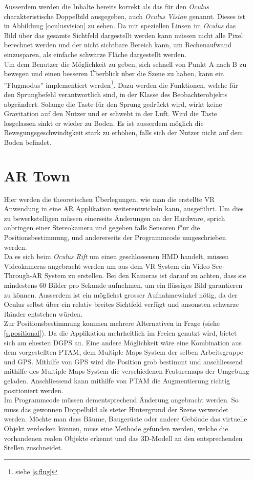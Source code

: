  Ausserdem werden die Inhalte bereits korrekt als das für den \textit{Oculus} charakteristische Doppelbild ausgegeben, auch \textit{Oculus Vision} genannt. Dieses ist in Abbildung \ref{oculusvision} zu sehen. Da mit speziellen Linsen im \textit{Oculus} das Bild über das gesamte Sichtfeld dargestellt werden kann müssen nicht alle Pixel berechnet werden und der nicht sichtbare Bereich kann, um Rechenaufwand einzusparen, als einfache schwarze Fläche dargestellt werden.\\[6pt]
Um dem Benutzer die Möglichkeit zu geben, sich schnell von Punkt A nach B zu bewegen und einen besseren Überblick über die Szene zu haben, kann ein ''Flugmodus'' implementiert werden\footnote{siehe \ref{s.flug}}. Dazu werden die Funktionen, welche für den Sprungbefehl verantwortlich sind, in der Klasse des Beobachterobjekts abgeändert. Solange die Taste für den Sprung gedrückt wird, wirkt keine Gravitation auf den Nutzer und er schwebt in der Luft. Wird die Taste losgelassen sinkt er wieder zu Boden. Es ist ausserdem möglich die Bewegungsgeschwindigkeit stark zu erhöhen, falls sich der Nutzer nicht auf dem Boden befindet.

\section{AR Town}\label{c.artown}
Hier werden die theoretischen Überlegungen, wie man die erstellte VR Anwendung in eine AR Applikation weiterentwickeln kann, ausgeführt. Um dies zu bewerkstelligen müssen einerseits Änderungen an der Hardware, sprich anbringen einer Stereokamera und gegeben falls Sensoren f"ur die Positionsbestimmung, und andererseits der Programmcode umgeschrieben werden.\\[6pt]
Da es sich beim \textit{Oculus Rift} um einen geschlossenen HMD handelt, müssen Videokameras angebracht werden um aus dem VR System ein Video See-Through-AR System zu erstellen. Bei den Kameras ist darauf zu achten, dass sie mindestens 60 Bilder pro Sekunde aufnehmen, um ein flüssiges Bild garantieren zu können. Ausserdem ist ein möglichst grosser Aufnahmewinkel nötig, da der Oculus selbst über ein relativ breites Sichtfeld verfügt und ansonsten schwarze Ränder entstehen würden.\cite{website:arrift}\\[6pt]
Zur Positionsbestimmung kommen mehrere Alternativen in Frage (siehe \ref{s.positional}). Da die Applikation mehrheitlich im Freien genutzt wird, bietet sich am ehesten DGPS an. Eine andere Möglichkeit wäre eine Kombination aus dem vorgestellten PTAM, dem Multiple Maps System der selben Arbeitsgruppe\cite{website:multimaps} und GPS. Mithilfe von GPS wird die Position grob bestimmt und anschliessend mithilfe des Multiple Maps System die verschiedenen Featuremaps der Umgebung geladen. Anschliessend kann mithilfe von PTAM die Augmentierung richtig positioniert werden.\\[6pt]
Im Programmcode müssen dementsprechend Änderung angebracht werden. So muss das gewonnen Doppelbild als steter Hintergrund der Szene verwendet werden. Möchte man dass Bäume, Baugerüste oder andere Gebäude das virtuelle Objekt verdecken können, muss eine Methode gefunden werden, welche die vorhandenen realen Objekte erkennt und das 3D-Modell an den entsprechenden Stellen zuschneidet.

